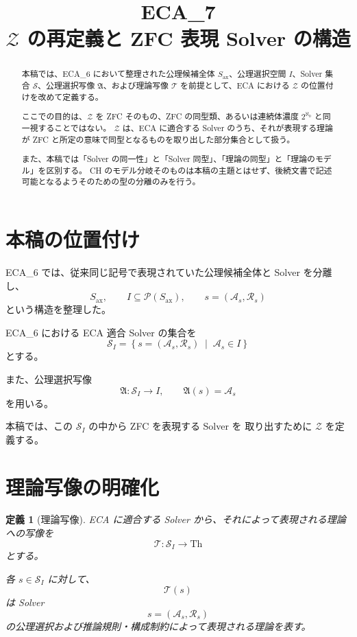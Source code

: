 \documentclass[a4paper,11pt]{jsarticle}
\title{ECA_7\\
$\mathcal{Z}$ の再定義と ZFC 表現 Solver の構造}
\author{}
\date{}
\newtheorem{definition}{定義}[section]
\newcommand{\Solver}{\mathcal{S}}
\newcommand{\Ax}{S_{\mathrm{ax}}}
\newcommand{\Th}{\mathrm{Th}}
\begin{document}
\maketitle

\begin{abstract}
本稿では、ECA_6 において整理された公理候補全体 $\Ax$、公理選択空間 $I$、Solver 集合 $\Solver$、公理選択写像 $\mathfrak{A}$、および理論写像 $\mathcal{T}$ を前提として、ECA における $\mathcal{Z}$ の位置付けを改めて定義する。

ここでの目的は、$\mathcal{Z}$ を ZFC そのもの、ZFC の同型類、あるいは連続体濃度 $2^{\aleph_0}$ と同一視することではない。
$\mathcal{Z}$ は、ECA に適合する Solver のうち、それが表現する理論が ZFC と所定の意味で同型となるものを取り出した部分集合として扱う。

また、本稿では「Solver の同一性」と「Solver 同型」、「理論の同型」と「理論のモデル」を区別する。
CH のモデル分岐そのものは本稿の主題とはせず、後続文書で記述可能となるようそのための型の分離のみを行う。
\end{abstract}

\section{本稿の位置付け}

ECA_6 では、従来同じ記号で表現されていた公理候補全体と
Solver を分離し、
\[
\Ax,\qquad
I\subseteq\mathcal{P}(\Ax),\qquad
s=(\mathcal{A}_s,\mathcal{R}_s)
\]
という構造を整理した。

ECA_6 における ECA 適合 Solver の集合を
\[
\Solver_I
=
\left\{
s=(\mathcal{A}_s,\mathcal{R}_s)
\;\middle|\;
\mathcal{A}_s\in I
\right\}
\]
とする。

また、公理選択写像
\[
\mathfrak{A}:\Solver_I\longrightarrow I,
\qquad
\mathfrak{A}(s)=\mathcal{A}_s
\]
を用いる。

本稿では、この $\Solver_I$ の中から ZFC を表現する Solver を
取り出すために $\mathcal{Z}$ を定義する。

\section{理論写像の明確化}

\begin{definition}[理論写像]
ECA に適合する Solver から、それによって表現される理論への写像を
\[
\boxed{
\mathcal{T}:\Solver_I\longrightarrow\Th
}
\]
とする。

各 $s\in\Solver_I$ に対して、
\[
\mathcal{T}(s)
\]
は Solver
\[
s=(\mathcal{A}_s,\mathcal{R}_s)
\]
の公理選択および推論規則・構成制約によって表現される理論を表す。
\end{definition}
\end{document}
